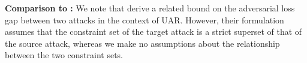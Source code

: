 


\noindent \textbf{Comparison to \citet{dai2022formulating}: } We note that \citet[Theorem 4.2]{dai2022formulating} derive a related bound on the adversarial loss gap between two attacks in the context of UAR. However, their formulation assumes that the constraint set of the target attack is a strict superset of that of the source attack, whereas we make no assumptions about the relationship between the two constraint sets.
   


